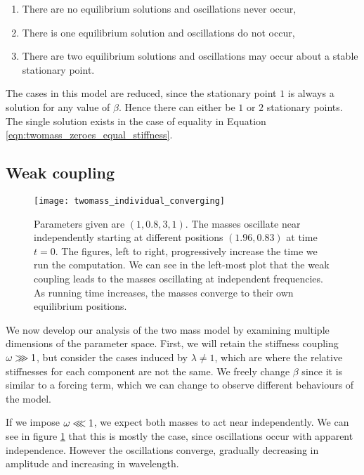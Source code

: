 \documentclass{article}
\begin{document}

\begin{enumerate}
    \item There are no equilibrium solutions and oscillations never occur,
    \item There is one equilibrium solution and oscillations do not occur,
    \item There are two equilibrium solutions and oscillations may occur about a stable stationary point.
\end{enumerate} %

The cases in this model are reduced, since the stationary point $1$ is always a solution for any value of \(\beta\).
Hence there can either be $1$ or $2$ stationary points.
The single solution exists in the case of equality in Equation \ref{eqn:twomass_zeroes_equal_stiffness}.



\subsection{Weak coupling}

\begin{figure}
    \centering
    \texttt{[image: twomass\_individual\_converging]}
    \caption{
        Parameters given are \((1, 0.8, 3, 1)\). The masses oscillate near independently starting at different positions $(1.96, 0.83)$ at time $t=0$.
        The figures, left to right, progressively increase the time we run the computation.
        We can see in the left-most plot that the weak coupling leads to the masses oscillating at independent frequencies.
        As running time increases, the masses converge to their own equilibrium positions.
        }
    \label{fig:twomass_independent}
\end{figure}
We now develop our analysis of the two mass model by examining multiple dimensions of the parameter space.
First, we will retain the stiffness coupling \(\omega \gggtr 1\),
but consider the cases induced by \(\lambda \ne 1\), which are where the relative stiffnesses for each component are not the same.
We freely change \(\beta\) since it is similar to a forcing term, which we can change to observe different behaviours of the model.

If we impose \(\omega \llless 1\), we expect both masses to act near independently.
We can see in figure \ref{fig:twomass_independent} that this is mostly the case, since oscillations occur with apparent independence.
However the oscillations converge, gradually decreasing in amplitude and increasing in wavelength.
\end{document}
